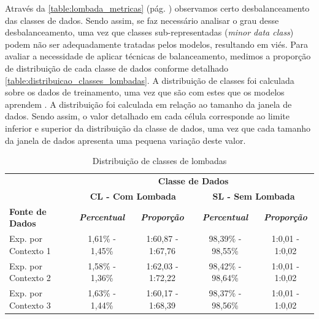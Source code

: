 Através da \autoref{table:lombada_metricas} (pág. \pageref{table:lombada_metricas}) observamos certo desbalanceamento das classes de dados. Sendo assim, se faz necessário analisar o grau desse desbalanceamento, uma vez que classes sub-representadas (\textit{minor data class}) podem não ser adequadamente tratadas pelos modelos, resultando em viés. Para avaliar a necessidade de aplicar técnicas de balanceamento, medimos a proporção de distribuição de cada classe de dados conforme detalhado \autoref{table:distribuicao_classes_lombadas}. A distribuição de classes foi calculada sobre os dados de treinamento, uma vez que são com estes que os modelos aprendem \cite{He2013, Kuhn2013}. A distribuição foi calculada em relação ao tamanho da janela de dados. Sendo assim, o valor detalhado em cada célula corresponde ao limite inferior e superior da distribuição da classe de dados, uma vez que cada tamanho da janela de dados apresenta uma pequena variação deste valor.

\begin{table}[h]
\caption{Distribuição de classes de lombadas}
\label{table:distribuicao_classes_lombadas}
\centering
\scriptsize
\begin{tabular}{lcccc}
\cmidrule(l){2-5}
\multicolumn{1}{c}{\multirow{2}{*}{\textbf{}}} & 
\multicolumn{4}{c}{\textbf{Classe de Dados}} \\ \cmidrule(l){2-5} 
\multicolumn{1}{c}{} & 
\multicolumn{2}{c}{\textbf{CL - Com Lombada}} & 
\multicolumn{2}{c}{\textbf{SL - Sem Lombada}} \\ \midrule
\textbf{Fonte de Dados} & 
\textit{\textbf{Percentual}} & 
\textit{\textbf{Proporção}} & 
\textit{\textbf{Percentual}} & 
\textit{\textbf{Proporção}} \\ \midrule
Exp. por Contexto 1 & 1,61\% - 1,45\% & 1:60,87 - 1:67,76 & 98,39\% - 98,55\% & 1:0,01 - 1:0,02 \\ \midrule
Exp. por Contexto 2 & 1,58\% - 1,36\% & 1:62,03 - 1:72,22 & 98,42\% - 98,64\% & 1:0,01 - 1:0,02 \\ \midrule
Exp. por Contexto 3 & 1,63\% - 1,44\% & 1:60,17 - 1:68,39 & 98,37\% - 98,56\% & 1:0,01 - 1:0,02 \\ \bottomrule
\end{tabular}
\end{table}

